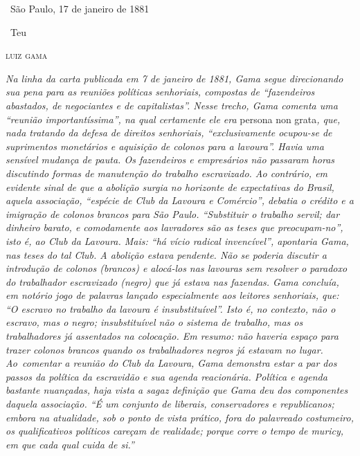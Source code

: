\hfill\ São Paulo, 17 de janeiro de 1881

\hfill\ Teu

\hfill\textsc{luiz gama}


\begin{resumo}
\emph{Na linha da carta publicada em 7 de janeiro de 1881, Gama segue direcionando
sua pena para as reuniões políticas senhoriais, compostas de
``fazendeiros abastados, de negociantes e de capitalistas''. Nesse trecho,
Gama comenta uma ``reunião importantíssima'', na qual certamente ele era}
persona non grata\emph{, que, nada tratando da defesa de direitos senhoriais,
``exclusivamente ocupou-se de suprimentos monetários e aquisição de
colonos para a lavoura''. Havia uma sensível mudança de pauta. Os
fazendeiros e empresários não passaram horas discutindo formas de
manutenção do trabalho escravizado. Ao contrário, em evidente sinal de
que a abolição surgia no horizonte de expectativas do Brasil, aquela
associação, ``espécie de Club da Lavoura e Comércio'', debatia o crédito e
a imigração de colonos brancos para São Paulo. ``Substituir o trabalho
servil; dar dinheiro barato, e comodamente aos lavradores são as teses
que preocupam-no'', isto é, ao Club da Lavoura. Mais: ``há vício radical
invencível'', apontaria Gama, nas teses do tal Club. A abolição estava
pendente. Não se poderia discutir a introdução de colonos (brancos) e
alocá-los nas lavouras sem resolver o paradoxo do trabalhador
escravizado (negro) que já estava nas fazendas. Gama concluía, em
notório jogo de palavras lançado especialmente aos leitores senhoriais,
que: ``O escravo no trabalho da lavoura é insubstituível''. Isto é, no
contexto, não o escravo, mas o negro; insubstituível não o sistema de
trabalho, mas os trabalhadores já assentados na colocação. Em resumo:
não haveria espaço para trazer colonos brancos quando os trabalhadores
negros já estavam no lugar. Ao~comentar a reunião do Club da Lavoura,
Gama demonstra estar a par dos passos da política da escravidão e sua
agenda reacionária. Política e agenda bastante nuançadas, haja vista a
sagaz definição que Gama deu dos componentes daquela associação. ``É um
conjunto de liberais, conservadores e republicanos; embora na
atualidade, sob o ponto de vista prático, fora do palavreado costumeiro,
os qualificativos políticos careçam de realidade; porque corre o tempo
de muricy, em que cada qual cuida de si.''}
\end{resumo}\pagebreak

